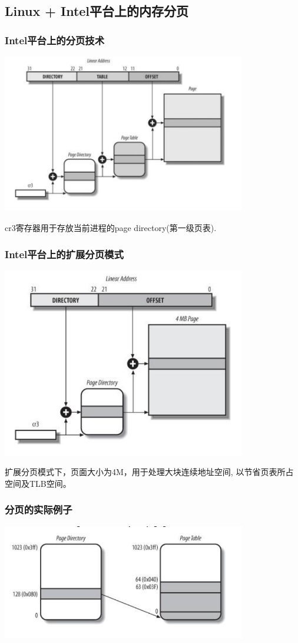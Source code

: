 \documentclass[xcolor=svgnames]{beamer}
\begin{document}
\begin{CJK*}{UTF8}{gbsn}
\section{Linux + Intel平台上的内存分页}

\begin{frame}[fragile]
\frametitle{Intel平台上的分页技术}
\includegraphics[width=0.8\textwidth]{regpaging.png}

cr3寄存器用于存放当前进程的page directory(第一级页表).
\end{frame}

\begin{frame}[fragile]
\frametitle{Intel平台上的扩展分页模式}
\includegraphics[width=0.8\textwidth]{extpaging.png}

扩展分页模式下，页面大小为4M，用于处理大块连续地址空间,
以节省页表所占空间及TLB空间。
\end{frame}

\begin{frame}[fragile]
\frametitle{分页的实际例子}
\includegraphics[width=0.8\textwidth]{examplepaging.png}


\end{frame}
\end{CJK*}
\end{document}
